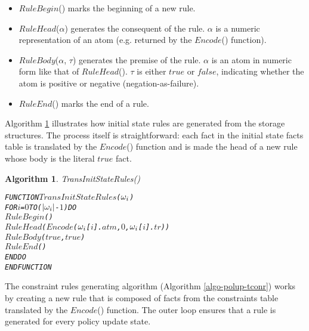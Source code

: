 \documentclass[11pt]{report}
\newenvironment{vverbatim}
{
  \begin{alltt}
}
{
    \vspace{-\baselineskip}
  \end{alltt}
}
\newtheorem{vvalgorithm}{Algorithm}[chapter]
\newenvironment{valgorithm}[2]
{
  \begin{vvalgorithm}{#1}
    \label{#2}
    \small
    \begin{vverbatim}
}
{
    \end{vverbatim}
  \end{vvalgorithm}
}
\begin{document}
          \begin{itemize}
            \item
              $RuleBegin$() marks the beginning of a new rule.
            \item
              $RuleHead$($\alpha$) generates the consequent of the rule.
              $\alpha$ is a numeric representation of an atom (e.g. returned by
              the $Encode$() function).
            \item
              $RuleBody$($\alpha$, $\tau$) generates the premise of the rule.
              $\alpha$ is an atom in numeric form like that of $RuleHead$().
              $\tau$ is either $true$ or $false$, indicating whether the atom
              is positive or negative (negation-as-failure).
            \item
              $RuleEnd$() marks the end of a rule.
          \end{itemize}

          Algorithm \ref{algo-polup-tisr} illustrates how initial state rules
          are generated from the storage structures. The process itself is
          straightforward: each fact in the initial state facts table is
          translated by the $Encode$() function and is made the head of a new
          rule whose body is the literal $true$ fact.

          \begin{valgorithm}{TransInitStateRules()}{algo-polup-tisr}
FUNCTION \(TransInitStateRules\)(\(\omega\sb{i}\))
  FOR \(i\) = \(0\) TO (\(|\omega\sb{i}|\) - \(1\)) DO
    \(RuleBegin\)()
    \(RuleHead\)(\(Encode\)(\(\omega\sb{i}\)[\(i\)].\(atm\), \(0\), \(\omega\sb{i}\)[\(i\)].\(tr\)))
    \(RuleBody\)(\(true\), \(true\))
    \(RuleEnd\)()
  ENDDO
ENDFUNCTION
          \end{valgorithm}

          The constraint rules generating algorithm (Algorithm
          \ref{algo-polup-tconr}) works by creating a new rule that is
          composed of facts from the constraints table translated by the
          $Encode$() function. The outer loop ensures that a rule is
          generated for every policy update state.
\end{document}
